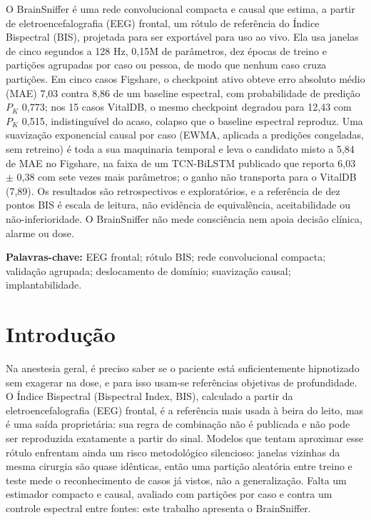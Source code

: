 \documentclass[12pt]{article}
\begin{document}
\begin{resumo}
O BrainSniffer é uma rede convolucional compacta e causal que estima, a partir de eletroencefalografia (EEG) frontal, um rótulo de referência do Índice Bispectral (BIS), projetada para ser exportável para uso ao vivo. Ela usa janelas de cinco segundos a 128 Hz, 0,15M de parâmetros, dez épocas de treino e partições agrupadas por caso ou pessoa, de modo que nenhum caso cruza partições. Em cinco casos Figshare, o checkpoint ativo obteve erro absoluto médio (MAE) 7,03 contra 8,86 de um baseline espectral, com probabilidade de predição $P_K$ 0,773; nos 15 casos VitalDB, o mesmo checkpoint degradou para 12,43 com $P_K$ 0,515, indistinguível do acaso, colapso que o baseline espectral reproduz. Uma suavização exponencial causal por caso (EWMA, aplicada a predições congeladas, sem retreino) é toda a sua maquinaria temporal e leva o candidato misto a 5,84 de MAE no Figshare, na faixa de um TCN-BiLSTM publicado que reporta 6,03 $\pm$ 0,38 com sete vezes mais parâmetros; o ganho não transporta para o VitalDB (7,89). Os resultados são retrospectivos e exploratórios, e a referência de dez pontos BIS é escala de leitura, não evidência de equivalência, aceitabilidade ou não-inferioridade. O BrainSniffer não mede consciência nem apoia decisão clínica, alarme ou dose.

\textbf{Palavras-chave:} EEG frontal; rótulo BIS; rede convolucional compacta; validação agrupada; deslocamento de domínio; suavização causal; implantabilidade.
\end{resumo}

\section{Introdução}

Na anestesia geral, é preciso saber se o paciente está suficientemente hipnotizado sem exagerar na dose, e para isso usam-se referências objetivas de profundidade. O Índice Bispectral (Bispectral Index, BIS), calculado a partir da eletroencefalografia (EEG) frontal, é a referência mais usada à beira do leito, mas é uma saída proprietária: sua regra de combinação não é publicada e não pode ser reproduzida exatamente a partir do sinal. Modelos que tentam aproximar esse rótulo enfrentam ainda um risco metodológico silencioso: janelas vizinhas da mesma cirurgia são quase idênticas, então uma partição aleatória entre treino e teste mede o reconhecimento de casos já vistos, não a generalização. Falta um estimador compacto e causal, avaliado com partições por caso e contra um controle espectral entre fontes: este trabalho apresenta o BrainSniffer.
\end{document}
